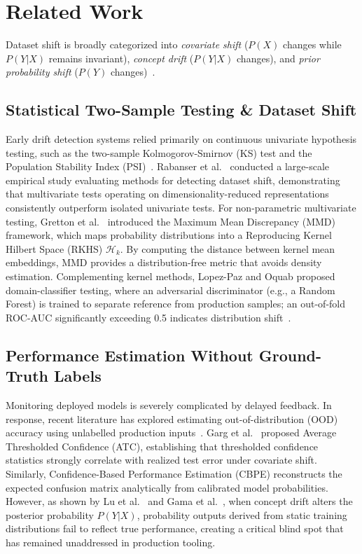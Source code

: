 \documentclass[conference]{IEEEtran}
\begin{document}
\section{Related Work}
Dataset shift is broadly categorized into \textit{covariate shift} ($P(X)$ changes while $P(Y|X)$ remains invariant), \textit{concept drift} ($P(Y|X)$ changes), and \textit{prior probability shift} ($P(Y)$ changes)~\cite{gama2014survey, lu2019learning}.

\subsection{Statistical Two-Sample Testing \& Dataset Shift}
Early drift detection systems relied primarily on continuous univariate hypothesis testing, such as the two-sample Kolmogorov-Smirnov (KS) test and the Population Stability Index (PSI)~\cite{rabanser2019failing}. Rabanser et al.~\cite{rabanser2019failing} conducted a large-scale empirical study evaluating methods for detecting dataset shift, demonstrating that multivariate tests operating on dimensionality-reduced representations consistently outperform isolated univariate tests. For non-parametric multivariate testing, Gretton et al.~\cite{gretton2012kernel} introduced the Maximum Mean Discrepancy (MMD) framework, which maps probability distributions into a Reproducing Kernel Hilbert Space (RKHS) $\mathcal{H}_k$. By computing the distance between kernel mean embeddings, MMD provides a distribution-free metric that avoids density estimation. Complementing kernel methods, Lopez-Paz and Oquab proposed domain-classifier testing, where an adversarial discriminator (e.g., a Random Forest) is trained to separate reference from production samples; an out-of-fold ROC-AUC significantly exceeding 0.5 indicates distribution shift~\cite{rabanser2019failing}.

\subsection{Performance Estimation Without Ground-Truth Labels}
Monitoring deployed models is severely complicated by delayed feedback. In response, recent literature has explored estimating out-of-distribution (OOD) accuracy using unlabelled production inputs~\cite{garg2022leveraging}. Garg et al.~\cite{garg2022leveraging} proposed Average Thresholded Confidence (ATC), establishing that thresholded confidence statistics strongly correlate with realized test error under covariate shift. Similarly, Confidence-Based Performance Estimation (CBPE) reconstructs the expected confusion matrix analytically from calibrated model probabilities. However, as shown by Lu et al.~\cite{lu2019learning} and Gama et al.~\cite{gama2014survey}, when concept drift alters the posterior probability $P(Y|X)$, probability outputs derived from static training distributions fail to reflect true performance, creating a critical blind spot that has remained unaddressed in production tooling.
\end{document}
